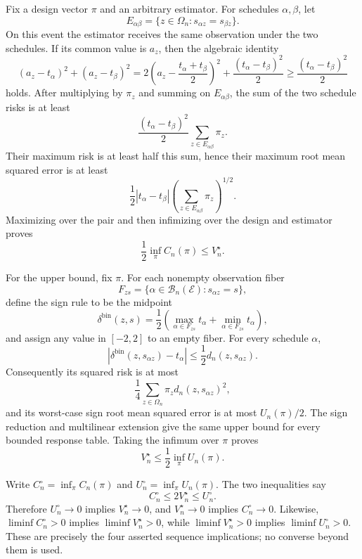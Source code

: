 Fix a design vector \(\pi\) and an arbitrary estimator.  For schedules \(\alpha,\beta\), let
\[
 E_{\alpha\beta}=\{z\in\Omega_n:s_{\alpha z}=s_{\beta z}\}.
\]
On this event the estimator receives the same observation under the two schedules.  If its common value is \(a_z\), then the algebraic identity
\[
 (a_z-t_\alpha)^2+(a_z-t_\beta)^2
 =2\left(a_z-\frac{t_\alpha+t_\beta}{2}\right)^2
  +\frac{(t_\alpha-t_\beta)^2}{2}
 \ge\frac{(t_\alpha-t_\beta)^2}{2}
\]
holds.  After multiplying by \(\pi_z\) and summing on \(E_{\alpha\beta}\), the sum of the two schedule risks is at least
\[
 \frac{(t_\alpha-t_\beta)^2}{2}
 \sum_{z\in E_{\alpha\beta}}\pi_z.
\]
Their maximum risk is at least half this sum, hence their maximum root mean squared error is at least
\[
 \frac12|t_\alpha-t_\beta|
 \left(\sum_{z\in E_{\alpha\beta}}\pi_z\right)^{1/2}.
\]
Maximizing over the pair and then infimizing over the design and estimator proves
\[
 \frac12\inf_\pi C_n(\pi)\le V_n^\star.
\]

For the upper bound, fix \(\pi\).  For each nonempty observation fiber
\[
 F_{zs}=\{\alpha\in\mathcal B_n(\mathcal E):s_{\alpha z}=s\},
\]
define the sign rule to be the midpoint
\[
 \delta^{\mathrm{bin}}(z,s)=
 \frac12\left(\max_{\alpha\in F_{zs}}t_\alpha+
                    \min_{\alpha\in F_{zs}}t_\alpha\right),
\]
and assign any value in \([-2,2]\) to an empty fiber.  For every schedule \(\alpha\),
\[
 |\delta^{\mathrm{bin}}(z,s_{\alpha z})-t_\alpha|
 \le\frac12d_n(z,s_{\alpha z}).
\]
Consequently its squared risk is at most
\[
 \frac14\sum_{z\in\Omega_n}\pi_zd_n(z,s_{\alpha z})^2,
\]
and its worst-case sign root mean squared error is at most \(U_n(\pi)/2\).  The sign reduction and multilinear extension give the same upper bound for every bounded response table.  Taking the infimum over \(\pi\) proves
\[
 V_n^\star\le\frac12\inf_\pi U_n(\pi).
\]

Write \(C_n^\circ=\inf_\pi C_n(\pi)\) and \(U_n^\circ=\inf_\pi U_n(\pi)\).  The two inequalities say
\[
 C_n^\circ\le2V_n^\star\le U_n^\circ.
\]
Therefore \(U_n^\circ\to0\) implies \(V_n^\star\to0\), and \(V_n^\star\to0\) implies \(C_n^\circ\to0\).  Likewise, \(\liminf C_n^\circ>0\) implies \(\liminf V_n^\star>0\), while \(\liminf V_n^\star>0\) implies \(\liminf U_n^\circ>0\).  These are precisely the four asserted sequence implications; no converse beyond them is used.